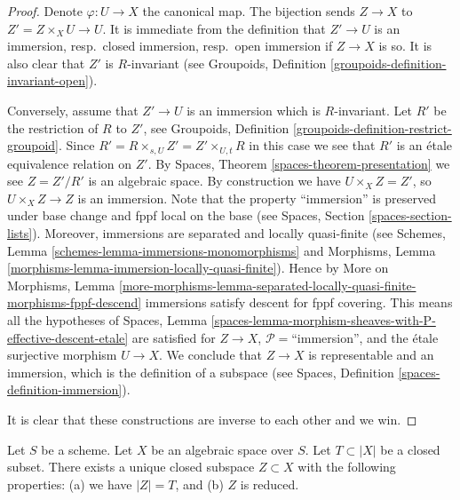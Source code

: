 \begin{proof}
Denote $\varphi : U \to X$ the canonical map. The bijection sends
$Z \to X$ to $Z' = Z \times_X U \to U$. It is immediate from the definition
that $Z' \to U$ is an immersion, resp.\ closed immersion, resp.\ open
immersion if $Z \to X$ is so. It is also clear that $Z'$ is $R$-invariant
(see Groupoids, Definition \ref{groupoids-definition-invariant-open}).

\medskip\noindent
Conversely, assume that $Z' \to U$ is an immersion which is $R$-invariant.
Let $R'$ be the restriction of $R$ to $Z'$, see
Groupoids, Definition \ref{groupoids-definition-restrict-groupoid}.
Since $R' = R \times_{s, U} Z' = Z' \times_{U, t} R$ in this case
we see that $R'$ is an \'etale equivalence relation on $Z'$. By
Spaces, Theorem \ref{spaces-theorem-presentation} we see
$Z = Z'/R'$ is an algebraic space. By construction we have
$U \times_X Z = Z'$, so $U \times_X Z \to Z$ is an immersion.
Note that the property ``immersion'' is preserved under base change
and fppf local on the base (see Spaces, Section \ref{spaces-section-lists}).
Moreover, immersions are separated and locally quasi-finite (see
Schemes, Lemma \ref{schemes-lemma-immersions-monomorphisms}
and
Morphisms, Lemma \ref{morphisms-lemma-immersion-locally-quasi-finite}).
Hence by More on Morphisms, Lemma
\ref{more-morphisms-lemma-separated-locally-quasi-finite-morphisms-fppf-descend}
immersions satisfy descent for fppf covering. This means all the hypotheses of
Spaces,
Lemma \ref{spaces-lemma-morphism-sheaves-with-P-effective-descent-etale}
are satisfied for $Z \to X$, $\mathcal{P}=$``immersion'',
and the \'etale surjective morphism $U \to X$. We conclude that $Z \to X$
is representable and an immersion, which is the
definition of a subspace (see
Spaces, Definition \ref{spaces-definition-immersion}).

\medskip\noindent
It is clear that these constructions are inverse to each other and we win.
\end{proof}

\begin{lemma}
\label{lemma-reduced-closed-subspace}
Let $S$ be a scheme.
Let $X$ be an algebraic space over $S$.
Let $T \subset |X|$ be a closed subset.
There exists a unique closed subspace $Z \subset X$ with
the following properties: (a) we have $|Z| = T$, and (b) $Z$ is reduced.
\end{lemma}


